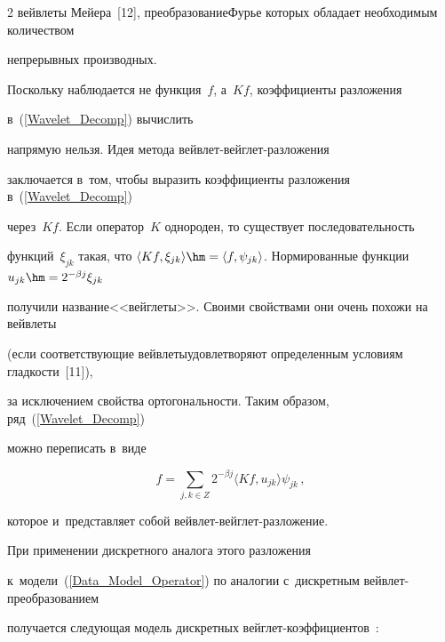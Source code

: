 \begin{multicols}{2}
вейвлеты Мейера~[12], преобразование\linebreak \mbox{Фурье} которых обладает необходимым количеством 

непрерывных производных.



Поскольку наблюдается не функция~$f$, а~$Kf$, коэффициенты разложения 

в~(\ref{Wavelet_Decomp}) вычислить

напрямую нельзя. Идея метода вейв\-лет-вейг\-лет-раз\-ло\-же\-ния 

заключается в~том, чтобы выразить коэффициенты разложения в~(\ref{Wavelet_Decomp}) 

через~$Kf$. Если \mbox{оператор}~$K$ однороден, то существует последовательность

 функций~$\xi_{jk}$ такая, что $\langle Kf, \xi_{jk}\rangle \hm= \langle f, 

 \psi_{jk}\rangle$. Нормированные функции $u_{jk}\hm=2^{-\beta j}\xi_{jk}$ 

 получили название\linebreak <<вейглеты>>. Своими свойствами они очень похо\-жи на вейвлеты 

 (если соответствующие вейвлеты\linebreak удовлетворяют определенным условиям глад\-кости~[11]), 

 за исключением свойства ортогональности. Таким образом, ряд~(\ref{Wavelet_Decomp}) 

 можно переписать в~виде

\begin{equation*}

f=\sum\limits_{j,k\in Z}2^{-\beta j}\langle Kf, u_{jk}\rangle\psi_{jk}\,,


\end{equation*}

которое и~представляет собой вейв\-лет-вейг\-лет-разложение.



При применении дискретного аналога этого разложения 

к~модели~(\ref{Data_Model_Operator}) по аналогии с~дискретным вейв\-лет-пре\-обра\-зо\-ва\-ни\-ем 

получается следующая модель дискретных вейг\-лет-ко\-эф\-фи\-ци\-ен\-тов~\cite{9-sh1}:



\columnbreak 




\end{multicols}
